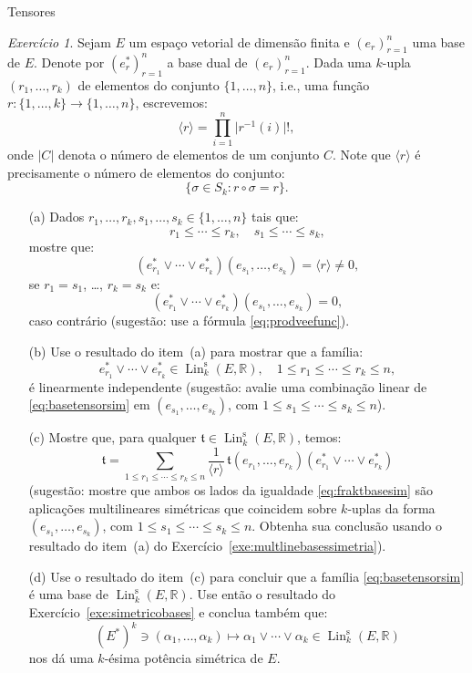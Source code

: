 \documentclass[oneside,11pt]{amsart}
\newcommand{\R}{\mathds R}
\DeclareMathOperator{\Lin}{Lin}
\theoremstyle{remark}\newtheorem{exercise}{Exercício}[section]
\theoremstyle{plain}\newtheorem{teo}{Teorema}[section]
\theoremstyle{plain}\newtheorem{lem}[teo]{Lema}
\theoremstyle{plain}\newtheorem{prop}[teo]{Proposição}
\theoremstyle{definition}\newtheorem{defin}[teo]{Definição}
\theoremstyle{remark}\newtheorem{rem}[teo]{Observação}
\theoremstyle{definition}\newtheorem{example}[teo]{Exemplo}
\numberwithin{equation}{section}
\begin{document}
\begin{section}{Tensores}
\begin{exercise}\label{exe:Linsbigvee}
Sejam $E$ um espaço vetorial de dimensão finita e $(e_r)_{r=1}^n$ uma base de $E$. Denote por $(e_r^*)_{r=1}^n$ a base dual de $(e_r)_{r=1}^n$.
Dada uma $k$-upla $(r_1,\ldots,r_k)$ de elementos do conjunto $\{1,\ldots,n\}$, i.e., uma função $r:\{1,\ldots,k\}\to\{1,\ldots,n\}$, escrevemos:
\[\langle r\rangle=\prod_{i=1}^n\vert r^{-1}(i)\vert!,\]
onde $\vert C\vert$ denota o número de elementos de um conjunto $C$. Note que $\langle r\rangle$ é precisamente o número de elementos do conjunto:
\[\big\{\sigma\in S_k:r\circ\sigma=r\big\}.\]
\begin{itemize}
\item[(a)] Dados $r_1,\ldots,r_k,s_1,\ldots,s_k\in\{1,\ldots,n\}$ tais que:
\[r_1\le\cdots\le r_k,\quad s_1\le\cdots\le s_k,\]
mostre que:
\[(e_{r_1}^*\vee\cdots\vee e_{r_k}^*)(e_{s_1},\ldots,e_{s_k})=\langle r\rangle\ne0,\]
se $r_1=s_1$, \dots, $r_k=s_k$ e:
\[(e_{r_1}^*\vee\cdots\vee e_{r_k}^*)(e_{s_1},\ldots,e_{s_k})=0,\]
caso contrário (sugestão: use a fórmula \eqref{eq:prodveefunc}).
\item[(b)] Use o resultado do item~(a) para mostrar que a família:
\begin{equation}\label{eq:basetensorsim}
e_{r_1}^*\vee\cdots\vee e_{r_k}^*\in\Lin_k^{\mathrm s}(E,\R),\quad1\le r_1\le\cdots\le r_k\le n,
\end{equation}
é linearmente independente (sugestão: avalie uma combinação linear de \eqref{eq:basetensorsim} em $(e_{s_1},\ldots,e_{s_k})$, com $1\le s_1\le\cdots\le s_k\le n$).
\item[(c)] Mostre que, para qualquer $\mathfrak t\in\Lin_k^{\mathrm s}(E,\R)$, temos:
\begin{equation}\label{eq:fraktbasesim}
\mathfrak t=\sum_{1\le r_1\le\cdots\le r_k\le n}\frac1{\langle r\rangle}\,\mathfrak t(e_{r_1},\ldots,e_{r_k})(e_{r_1}^*\vee\cdots\vee e_{r_k}^*)
\end{equation}
(sugestão: mostre que ambos os lados da igualdade \eqref{eq:fraktbasesim} são aplicações multilineares si\-mé\-tri\-cas que coincidem
sobre $k$-uplas da forma $(e_{s_1},\ldots,e_{s_k})$, com $1\le s_1\le\cdots\le s_k\le n$. Obtenha sua conclusão usando o resultado do item~(a) do
Exercício~\ref{exe:multlinebasessimetria}).
\item[(d)] Use o resultado do item~(c) para concluir que a família \eqref{eq:basetensorsim} é uma base de $\Lin_k^{\mathrm s}(E,\R)$. Use então o resultado
do Exercício~\ref{exe:simetricobases} e conclua também que:
\[(E^*)^k\ni(\alpha_1,\ldots,\alpha_k)\longmapsto\alpha_1\vee\cdots\vee\alpha_k\in\Lin_k^{\mathrm s}(E,\R)\]
nos dá uma $k$-ésima potência simétrica de $E$.
\end{itemize}
\end{exercise}


\end{section}
\end{document}

